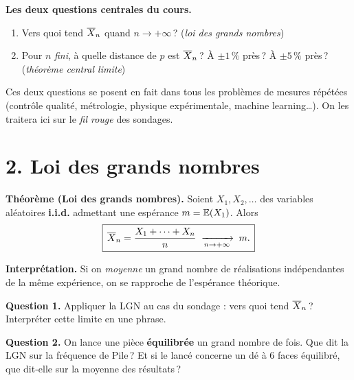 \textbf{Les deux questions centrales du cours.}
\begin{enumerate}
  \item Vers quoi tend $\overline{X}_n$ quand $n \to +\infty$\,? \hfill
    (\textit{loi des grands nombres})
  \item Pour $n$ \emph{fini}, à quelle distance de $p$ est $\overline{X}_n$\,?
    À $\pm 1\,\%$ près\,? À $\pm 5\,\%$ près\,? \hfill
    (\textit{théorème central limite})
\end{enumerate}

Ces deux questions se posent en fait dans tous les problèmes de
mesures répétées (contrôle qualité, métrologie, physique
expérimentale, machine learning\dots). On les traitera ici sur le
\emph{fil rouge} des sondages.

\section*{2. Loi des grands nombres}

\begin{mdframed}[backgroundcolor=ThemeLight, linecolor=Theme,
  linewidth=1pt, innertopmargin=8pt, innerbottommargin=8pt, nobreak=true]
\textbf{Théorème (Loi des grands nombres).}
Soient $X_1, X_2, \dots$ des variables aléatoires \textbf{i.i.d.}
admettant une espérance $m=\mathbb{E}(X_1)$. Alors
\[
  \boxed{\,\overline{X}_n = \dfrac{X_1+\cdots+X_n}{n}\;\xrightarrow[n\to+\infty]{}\; m.\,}
\]
\end{mdframed}

\textbf{Interprétation.}
Si on \emph{moyenne} un grand nombre de réalisations indépendantes
de la même expérience, on se rapproche de l'espérance théorique.

\medskip

\textbf{Question 1.} Appliquer la LGN au cas du sondage : vers
quoi tend $\overline{X}_n$\,? Interpréter cette limite en une phrase.


\textbf{Question 2.} On lance une pièce \textbf{équilibrée} un grand
nombre de fois. Que dit la LGN sur la fréquence de Pile\,? Et si le
lancé concerne un dé à $6$ faces équilibré, que dit-elle sur la
moyenne des résultats\,?


